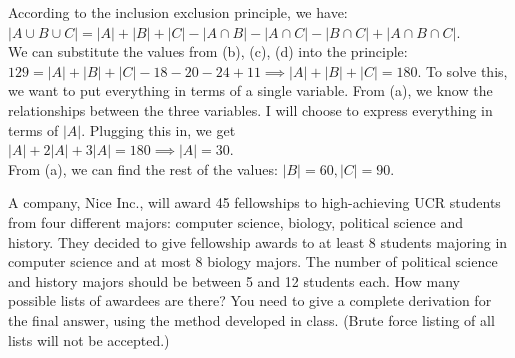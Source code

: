 \documentclass[11pt]{article}
\begin{document}

\begin{solution}
	According to the inclusion exclusion principle, we have: \\ $|A \cup B \cup C| = |A| + |B| + |C| - |A \cap B| - |A \cap C| - |B \cap C| + |A \cap B \cap C|$.
   \\
   We can substitute the values from (b), (c), (d) into the principle:
   \\
   $129 = |A| + |B| + |C| - 18 - 20 - 24 + 11 \implies |A| + |B| + |C| = 180$. To solve this, we want to put everything in terms of a single variable. From (a), we know the relationships between the three variables. I will choose to express everything in terms of $|A|$. Plugging this in, we get 
   \\ 
   $|A| +  2|A| + 3|A| = 180 \implies |A| = 30$. 
   \\ 
   From (a), we can find the rest of the values: $|B| = 60, |C| = 90$.

\end{solution}

\newpage

\begin{problem}
	A company, Nice Inc., will award 45 fellowships to high-achieving UCR students from four different majors: computer science, biology, political science and history. They decided to give fellowship awards to at least 8 students majoring in computer science and at most 8 biology majors. The number of political science and history majors should be between 5 and 12 students each. How many possible lists of awardees are there? You need to give a complete derivation for the final answer, using the method developed in class. 
	(Brute force listing of all lists will not be accepted.)
	
\end{problem}
	
\end{document}
